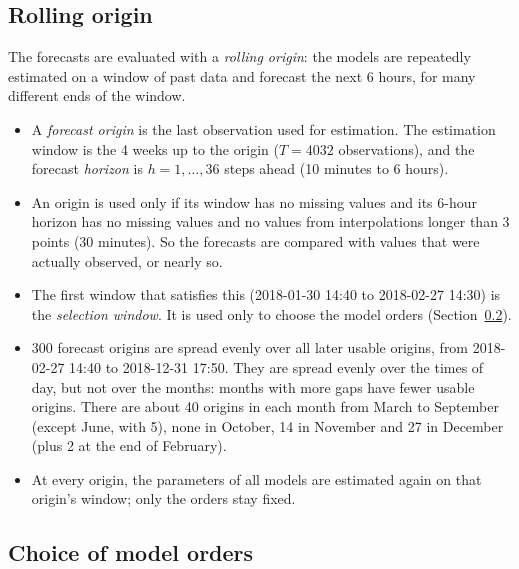\documentclass[11pt,a4paper]{article}
\begin{document}
\subsection{Rolling origin}

The forecasts are evaluated with a \emph{rolling origin}: the models are repeatedly estimated on a
window of past data and forecast the next 6 hours, for many different ends of the window.
\begin{itemize}
  \item A \emph{forecast origin} is the last observation used for estimation. The estimation
    window is the 4 weeks up to the origin ($T = 4032$ observations), and the forecast
    \emph{horizon} is $h = 1, \dots, 36$ steps ahead (10 minutes to 6 hours).
  \item An origin is used only if its window has no missing values and its 6-hour horizon has no
    missing values and no values from interpolations longer than 3 points (30 minutes). So the
    forecasts are compared with values that were actually observed, or nearly so.
  \item The first window that satisfies this (2018-01-30 14:40 to 2018-02-27 14:30) is the
    \emph{selection window}. It is used only to choose the model orders
    (Section~\ref{sec:selection}).
  \item 300 forecast origins are spread evenly over all later usable origins, from 2018-02-27 14:40
    to 2018-12-31 17:50. They are spread evenly over the times of day, but not over the months:
    months with more gaps have fewer usable origins. There are about 40 origins in each month from
    March to September (except June, with 5), none in October, 14 in November and 27 in December
    (plus 2 at the end of February).
  \item At every origin, the parameters of all models are estimated again on that origin's
    window; only the orders stay fixed.
\end{itemize}

\subsection{Choice of model orders}\label{sec:selection}
\end{document}
